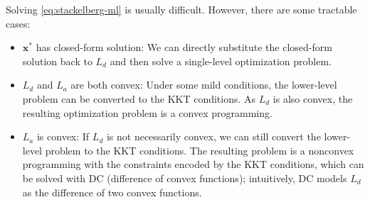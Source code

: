     Solving \eqref{eq:stackelberg-ml} is usually difficult.
    However, there are some tractable cases:
        \begin{itemize}
            \item $\bm{x}^\ast$ has closed-form solution: We can directly substitute the closed-form solution back to $L_d$ and then solve a single-level optimization problem.
            \item $L_d$ and $L_a$ are both convex: Under some mild conditions, the lower-level problem can be converted to the KKT conditions.
            As $L_d$ is also convex, the resulting optimization problem is a convex programming.
            \item $L_a$ is convex: If $L_d$ is not necessarily convex, we can still convert the lower-level problem to the KKT conditions. 
            The resulting problem is a nonconvex programming with the constraints encoded by the KKT conditions, which can be solved with DC (difference of convex functions); intuitively, DC models $L_d$ as the difference of two convex functions.
        \end{itemize}
    